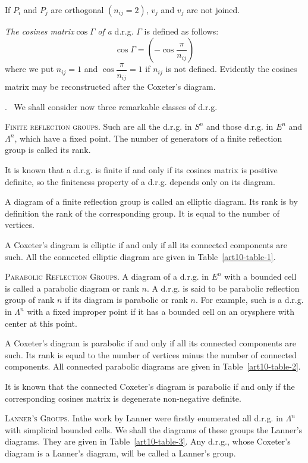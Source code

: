 If $P_i$ and $P_j$ are orthogonal $(n_{ij} =2)$, $v_j$ and $v_j$  are not joined. 

\textit{The cosines matrix}\pageoriginale $\cos \Gamma$ \textit{of a} d.r.g. $\Gamma$ is defined as follows:
$$
\cos \Gamma = \left(-\cos \frac{\pi}{n_{ij}} \right)
$$
where we put $n_{ij} =1$ and $\cos \dfrac{\pi}{n_{ij}} =1$ if $n_{ij}$ is not defined. Evidently the cosines matrix may be reconstructed after the Coxeter's diagram. 

.~ We shall consider now three remarkable classes of d.r.g.

\textsc{Finite reflection groups.} Such are all the d.r.g. in $S^n$ and those d.r.g. in $E^n$ and $\Lambda^n$, which have a fixed point. The number of generators of a finite reflection group is called its rank.

It is known \cite{art10-key1} that a d.r.g. is finite if and only if its cosines matrix is positive definite, so the finiteness property of a d.r.g. depends only on its diagram. 

A diagram of a finite reflection group is called an elliptic diagram. Its rank is by definition the rank of the corresponding group. It is equal to the number of vertices.

A Coxeter's diagram is elliptic if and  only if all its connected components are such. All the connected elliptic diagram are given in Table~\ref{art10-table-1}.

\medskip
\noindent
\textsc{Parabolic Reflection Groups.} A diagram of a d.r.g. in $E^n$ with a bounded cell is called a parabolic diagram or rank $n$. A d.r.g. is said to be parabolic reflection group of rank $n$ if its diagram is parabolic or rank $n$. For example, such is a d.r.g. in $\Lambda^n$ with a fixed improper point if it has a bounded cell on an orysphere with center at this point.

A Coxeter's diagram is parabolic if and only if all its connected components are such. Its rank is equal to the number of vertices minus the number of connected components. All connected parabolic diagrams are  given in Table~\ref{art10-table-2}.

It is known \cite{art10-key1} that the connected Coxeter's diagram is parabolic if and only if the corresponding cosines matrix is degenerate non-negative definite.

\medskip
\noindent
\textsc{Lanner's Groups.} In\pageoriginale the work \cite{art10-key3} by Lanner were firstly enumerated all d.r.g. in $\Lambda^n$ with simplicial bounded cells. We shall the diagrams of these groups the Lanner's diagrams. They are given in Table~\ref{art10-table-3}. Any d.r.g., whose Coxeter's diagram is a Lanner's diagram, will be called a Lanner's group. 

